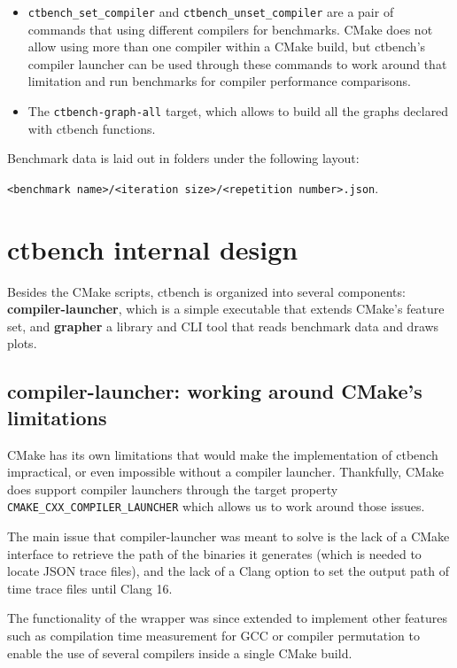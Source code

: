 \documentclass[../main]{subfiles}
\begin{document}
\begin{itemize}
\item
\lstinline{ctbench_set_compiler} and \lstinline{ctbench_unset_compiler}
are a pair of commands that using different compilers for benchmarks.
CMake does not allow using more than one compiler within a CMake build,
but ctbench's compiler launcher can be used through these commands
to work around that limitation and run benchmarks for compiler performance
comparisons.

\item
The \lstinline{ctbench-graph-all} target, which allows to build all the graphs
declared with ctbench functions.

\end{itemize}

Benchmark data is laid out in folders under the following layout:

\lstinline{<benchmark name>/<iteration size>/<repetition number>.json}.

\section{
  ctbench internal design
}

Besides the CMake scripts, ctbench is organized into several components:
\textbf{compiler-launcher}, which is a simple executable that extends CMake's
feature set, and \textbf{grapher} a \cpp library and CLI tool that reads
benchmark data and draws plots.

\subsection{
  compiler-launcher: working around CMake's limitations
}

CMake has its own limitations that would make the implementation of ctbench
impractical, or even impossible without a compiler launcher. Thankfully, CMake
does support compiler launchers through the target property
\lstinline{CMAKE_CXX_COMPILER_LAUNCHER} which allows us to work around
those issues.

The main issue that compiler-launcher was meant to solve is the lack of
a CMake interface to retrieve the path of the binaries it generates (which is
needed to locate JSON trace files), and the lack of a Clang option to set
the output path of time trace files until Clang 16.

The functionality of the wrapper was since extended to implement other features
such as compilation time measurement for GCC or compiler permutation
to enable the use of several \cpp compilers inside a single CMake build.
\end{document}
